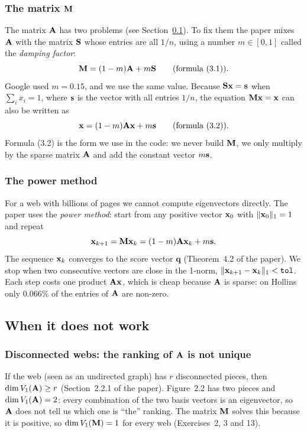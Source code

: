 \subsubsection*{The matrix $\mathbf{M}$}

The matrix $\mathbf{A}$ has two problems (see Section~\ref{sec:when}).
To fix them the paper mixes $\mathbf{A}$ with the matrix $\mathbf{S}$ whose entries are all $1/n$, using a number $m \in [0,1]$ called the \emph{damping factor}:
\[
  \mathbf{M} = (1-m)\mathbf{A} + m\mathbf{S} \qquad\text{(formula (3.1))}.
\]
Google used $m = 0.15$, and we use the same value.
Because $\mathbf{S}\mathbf{x} = \mathbf{s}$ when $\sum_i x_i = 1$, where $\mathbf{s}$ is the vector with all entries $1/n$, the equation $\mathbf{M}\mathbf{x} = \mathbf{x}$ can also be written as
\[
  \mathbf{x} = (1-m)\mathbf{A}\mathbf{x} + m\mathbf{s} \qquad\text{(formula (3.2))}.
\]
Formula (3.2) is the form we use in the code: we never build $\mathbf{M}$, we only multiply by the sparse matrix $\mathbf{A}$ and add the constant vector $m\mathbf{s}$.

\subsubsection*{The power method}

For a web with billions of pages we cannot compute eigenvectors directly.
The paper uses the \emph{power method}: start from any positive vector $\mathbf{x}_0$ with $\|\mathbf{x}_0\|_1 = 1$ and repeat
\[
  \mathbf{x}_{k+1} = \mathbf{M}\mathbf{x}_k = (1-m)\mathbf{A}\mathbf{x}_k + m\mathbf{s} .
\]
The sequence $\mathbf{x}_k$ converges to the score vector $\mathbf{q}$ (Theorem~4.2 of the paper).
We stop when two consecutive vectors are close in the 1-norm, $\|\mathbf{x}_{k+1}-\mathbf{x}_k\|_1 < \texttt{tol}$.
Each step costs one product $\mathbf{A}\mathbf{x}$, which is cheap because $\mathbf{A}$ is sparse: on Hollins only $0.066\%$ of the entries of $\mathbf{A}$ are non-zero.

\subsection{When it does not work}
\label{sec:when}

\subsubsection*{Disconnected webs: the ranking of $\mathbf{A}$ is not unique}

If the web (seen as an undirected graph) has $r$ disconnected pieces, then $\dim V_1(\mathbf{A}) \ge r$ (Section~2.2.1 of the paper).
Figure~2.2 has two pieces and $\dim V_1(\mathbf{A}) = 2$: every combination of the two basis vectors is an eigenvector, so $\mathbf{A}$ does not tell us which one is ``the'' ranking.
The matrix $\mathbf{M}$ solves this because it is positive, so $\dim V_1(\mathbf{M}) = 1$ for every web (Exercises~2, 3 and 13).

